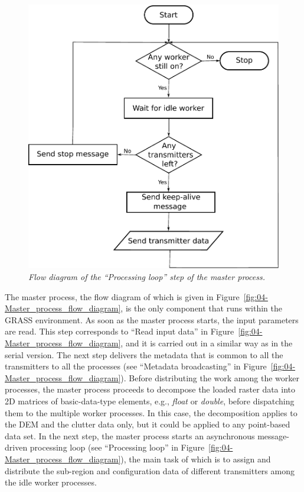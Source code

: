 \begin{figure}
\begin{minipage}[t]{0.49\textwidth}
\includegraphics[width=1\columnwidth]{04-framework_design_and_implementation/img/master_processing_loop_flow_diagram}

\caption{\textit{\emph{Flow diagram of the ``Processing loop'' step of the
master process.\label{fig:04-Processing_loop_in_master_process}}}}
%
\end{minipage}
\end{figure}


The master process, the flow diagram of which is given in Figure~\ref{fig:04-Master_process_flow_diagram},
is the only component that runs within the GRASS environment. As soon
as the master process starts, the input parameters are read. This
step corresponds to ``Read input data'' in Figure~\ref{fig:04-Master_process_flow_diagram},
and it is carried out in a similar way as in the serial version. The
next step delivers the metadata that is common to all the transmitters
to all the processes (see ``Metadata broadcasting'' in Figure~\ref{fig:04-Master_process_flow_diagram}).
Before distributing the work among the worker processes, the master
process proceeds to decompose the loaded raster data into 2D matrices
of basic-data-type elements, e.g., \emph{float} or \emph{double},
before dispatching them to the multiple worker processes. In this
case, the decomposition applies to the DEM and the clutter data only,
but it could be applied to any point-based data set. In the next step,
the master process starts an asynchronous message-driven processing
loop (see ``Processing loop'' in Figure~\ref{fig:04-Master_process_flow_diagram}),
the main task of which is to assign and distribute the sub-region
and configuration data of different transmitters among the idle worker
processes.

